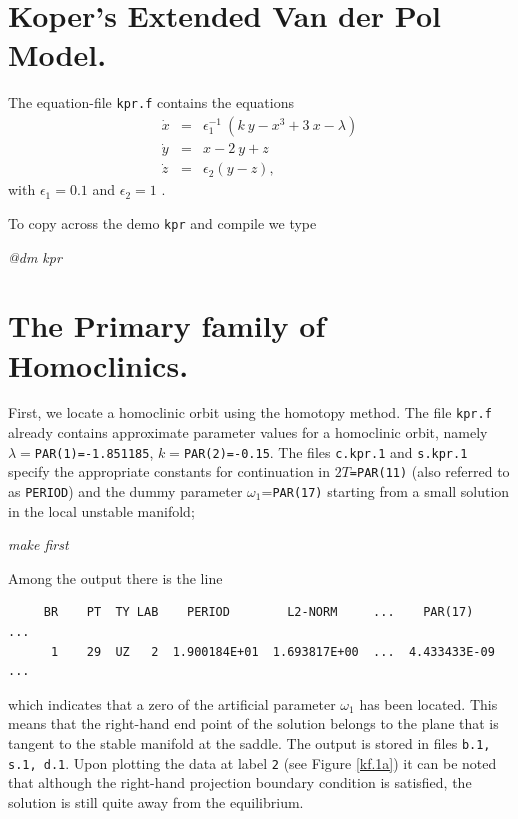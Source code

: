 \documentclass[12pt]{report}
\def\eps{\epsilon}
\begin{document}
\section{ Koper's Extended Van der Pol Model.}
%
The equation-file {\tt kpr.f} contains the equations
\begin{equation} \label{ko} \begin{array}{rcl}
\dot{x} & = & \eps_1^{-1}\:(k\: y - x^3 +3\:x - \lambda) \\
\dot{y} & = & x - 2\: y + z \\
\dot{z} & = & \eps_2(y-z), 
\end{array} \end{equation}
with $\eps_1 =0.1$ and $\eps_2=1$ \cite{Ko:95}.

To copy across the demo {\tt kpr} and compile we type
\begin{center}
{\it @dm kpr} \\
\end{center}

\section{The Primary family of Homoclinics.}
First, we locate a homoclinic orbit using 
the homotopy method. The file {\tt kpr.f} 
already contains 
approximate parameter values for a homoclinic orbit, 
namely $\lambda=${\tt PAR(1)=-1.851185}, $k=${\tt PAR(2)=-0.15}. 
The files {\tt c.kpr.1} and {\tt s.kpr.1} specify the appropriate
constants for continuation in $2T${\tt =PAR(11)} (also referred
to as {\tt PERIOD}) and the dummy parameter $\omega_1$={\tt PAR(17)}
starting
from a small solution in the local unstable manifold; 
\begin{center}
{\it make first}
\end{center}
Among the output there is the line
\begin{verbatim}
     BR    PT  TY LAB    PERIOD        L2-NORM     ...    PAR(17)    ...
      1    29  UZ   2  1.900184E+01  1.693817E+00  ...  4.433433E-09 ... 
\end{verbatim}
which indicates that a zero of the artificial parameter $\omega_1$
has been located. This means that the right-hand end point of the solution
belongs to the plane that is tangent to the stable manifold at the saddle. 
The output is stored in files {\tt b.1, s.1, d.1}. 
Upon plotting the data at label {\tt 2} (see Figure \ref{kf.1a})
it can be noted that although the right-hand projection boundary
condition is satisfied, the solution is still quite away from the
equilibrium. 
\end{document}

